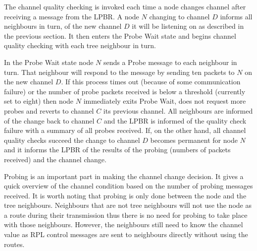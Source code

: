 The channel quality checking is invoked each time a node changes channel after receiving a message from the LPBR.  A node $N$ changing to channel $D$ informs all neighbours in turn, of the new channel $D$ it will be listening on as described in the previous section.  It then enters the Probe Wait state and begins channel quality checking with each tree neighbour in turn.  

In the Probe Wait state node $N$ sends a Probe message to each neighbour in turn.  That neighbour will respond
to the message by sending ten packets to $N$ on the new channel $D$.  If this process times out (because of some communication failure) or the number of probe packets received is below a threshold (currently set to
eight) then node $N$ immediately exits Probe Wait, does not request more probes and reverts to channel $C$ its
previous channel.  All neighbours are informed of the change back to channel $C$ and the LPBR is informed of
the quality check failure with a summary of all probes received.
If, on the other hand, all channel quality checks succeed the change to channel $D$ becomes permanent for node $N$ and it informs the LPBR of the results of the probing (numbers of packets received) and the channel change.

Probing is an important part in making the channel change decision. It gives a quick overview of the channel condition based on the number of probing messages received. It is worth noting that probing is only done between the node and the tree neighbours. Neighbours that are not tree neighbours will not use the node as a route during their transmission thus there is no need for probing to take place with those neighbours. However, the neighbours still need to know the channel value as RPL control messages are sent to neighbours directly without using the routes.



